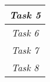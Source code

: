 \begin{center}
\begin{longtable}{|c|c|c|}
    \hline\multicolumn{3}{|c|}{\textit{Task 5}} \\\hline


    \hline\multicolumn{3}{|c|}{\textit{Task 6}} \\\hline


    \hline\multicolumn{3}{|c|}{\textit{Task 7}} \\\hline


    \hline\multicolumn{3}{|c|}{\textit{Task 8}} \\


    \end{longtable}
\renewcommand{\arraystretch}{1}
\end{center}







\setcounter{secnumdepth}{1}